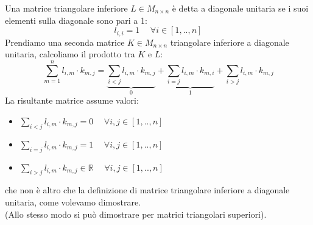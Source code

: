 \begin{flushleft}
Una matrice triangolare inferiore $L \in M_{n \times n}$ è detta a diagonale unitaria se i suoi elementi sulla diagonale sono pari a 1:
\[
l_{i,i}=1 \hspace{15pt} \forall i \in [1,..,n] 
\]
Prendiamo una seconda matrice $K \in M_{n \times n}$ triangolare inferiore a diagonale unitaria, calcoliamo il prodotto tra $K$ e $L$:
\[
\sum_{m=1}^n l_{i,m} \cdot k_{m,j} = \underbrace{ \sum_{i<j} l_{i,m} \cdot k_{m,j} }_{0} + \underbrace{ \sum_{i=j} l_{i,m} \cdot k_{m,i} }_{1} + \sum_{i>j} l_{i,m}\cdot k_{m,j}
\]
La risultante matrice assume valori:
\begin{itemize}
\item $\sum_{i<j} l_{i,m} \cdot k_{m,j} = 0 \hspace{15pt} \forall i,j \in [1,..,n] $ 
\item $\sum_{i=j} l_{i,m} \cdot k_{m,j} = 1 \hspace{15pt} \forall i,j \in [1,..,n] $ 
\item $\sum_{i>j} l_{i,m} \cdot k_{m,j} \in  \mathbb{R} \hspace{15pt} \forall i,j \in [1,..,n] $ 
\end{itemize}
che non è altro che la definizione di matrice triangolare inferiore a diagonale unitaria, come volevamo dimostrare.\\

(Allo stesso modo si può dimostrare per matrici triangolari superiori).
\end{flushleft}
